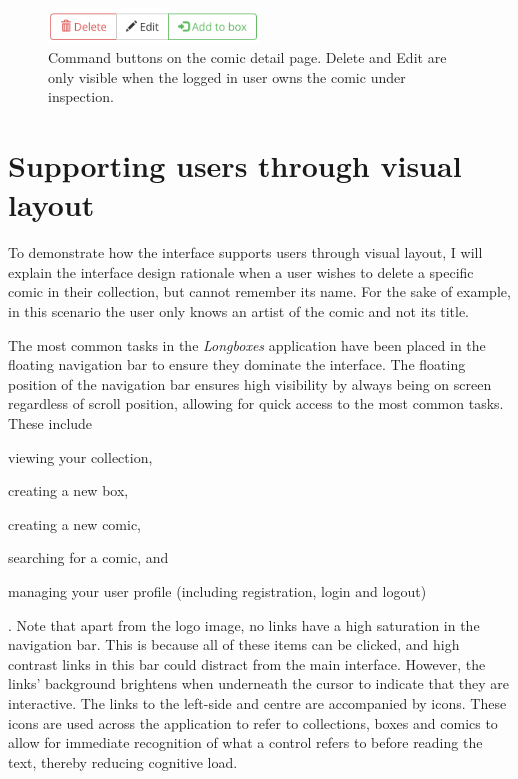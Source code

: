 \documentclass[fontsize=12pt,a4paper]{scrreprt}
\begin{document}
\begin{figure}[p]
  \centering
  \includegraphics[width=0.5\textwidth]{comic_command_buttons.png}
  \caption{
    Command buttons on the comic detail page. \textsf{Delete} and \textsf{Edit} are only visible when the logged in user owns the comic under inspection.
  }
  \label{fig:ComicCommandButtons}
\end{figure}

\FloatBarrier

\section{Supporting users through visual layout}


To demonstrate how the interface supports users through visual layout, I will explain the interface design rationale when a user wishes to delete a specific comic in their collection, but cannot remember its name. For the sake of example, in this scenario the user only knows an artist of the comic and not its title.


The most common tasks in the \emph{Longboxes} application have been placed in the floating navigation bar to ensure they dominate the interface. The floating position of the navigation bar ensures high visibility by always being on screen regardless of scroll position, allowing for quick access to the most common tasks. These include
\begin{inparaenum}
  \item viewing your collection,
  \item creating a new box,
  \item creating a new comic,
  \item searching for a comic, and
  \item managing your user profile (including registration, login and logout)%
\end{inparaenum}. Note that apart from the logo image, no links have a high saturation in the navigation bar. This is because all of these items can be clicked, and high contrast links in this bar could distract from the main interface. However, the links' background brightens when underneath the cursor to indicate that they are interactive. The links to the left-side and centre are accompanied by icons. These icons are used across the application to refer to collections, boxes and comics to allow for immediate recognition of what a control refers to before reading the text, thereby reducing cognitive load.
\end{document}
